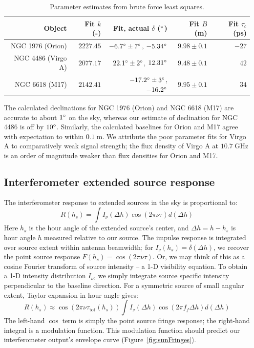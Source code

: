 \documentclass[10pt]{article}
\newcommand {\mt}{\mathrm}
\newcommand {\unit}[1]{\; \mt{#1}}
\begin{document}
\begin{table}[!ht]
\centering
\caption{Parameter estimates from brute force least squares.}
\label{tab:dec}
\begin{tabular}{@{}rrrrr@{}}
    \toprule
    Object & Fit $k$ (-)
        & Fit, actual $\delta$ ($\degree$)
        & Fit $B$ (m) & Fit $\tau_c$ (ps) \\
    \midrule
    NGC 1976 (Orion) & $2227.45$
        & $-6.7\degree \pm 7\degree$, $-5.34\degree$
        & $9.98 \pm 0.1$ & $-27$ \\
    NGC 4486 (Virgo A) & $2077.17$
        & $22.1\degree \pm 2\degree$, $12.31\degree$
        & $9.48 \pm 0.1$ & $42$ \\
    NGC 6618 (M17) & $2142.41$
        & $-17.2\degree \pm 3\degree$, $-16.2\degree$
        & $9.95 \pm 0.1$ & $34$ \\
    \bottomrule
\end{tabular}
\end{table}

The calculated declinations for NGC 1976 (Orion) and NGC 6618 (M17) are accurate to about $1\degree$ on the sky, whereas our estimate of declination for NGC 4486 is off by $10\degree$.  Similarly, the calculated baselines for Orion and M17 agree with expectation to within $0.1 \unit{m}$.  We attribute the poor parameter fits for Virgo A to comparatively weak signal strength; the flux density of Virgo A at $10.7 \unit{GHz}$ is an order of magnitude weaker than flux densities for Orion and M17.

\subsection{Interferometer extended source response}

The interferometer response to extended sources in the sky is proportional to:
\[
    R(h_s) = \int I_\nu (\Delta h) \cos(2\pi\nu \tau) d(\Delta h)
\]
Here $h_s$ is the hour angle of the extended source's center, and $\Delta h = h - h_s$ is hour angle $h$ measured relative to our source.  The impulse response is integrated over source extent within antenna beamwidth; for $I_\nu(h_s) = \delta(\Delta h)$, we recover the point source response $F(h_s) = \cos(2\pi\nu \tau)$.  Or, we may think of this as a cosine Fourier transform of source intensity -- a 1-D visibility equation.  To obtain a 1-D intensity distribution $I_\nu$, we simply integrate source specific intensity perpendicular to the baseline direction.  For a symmetric source of small angular extent, Taylor expansion in hour angle gives:
\[
    R(h_s) \approx \cos(2\pi\nu \tau_{\mathrm{tot}}(h_s)) \int I_\nu (\Delta h) \cos(2\pi f_f \Delta h) d(\Delta h)
\]
The left-hand $\cos$ term is simply the point source fringe response; the right-hand integral is a modulation function.  This modulation function should predict our interferometer output's envelope curve (Figure~\ref{fig:sunFringes}).
\end{document}
